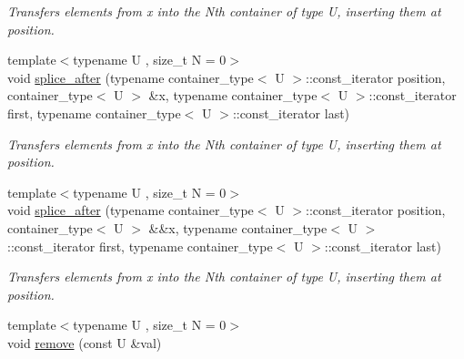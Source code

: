 \begin{DoxyCompactItemize}
\begin{DoxyCompactList}\small\item\em Transfers elements from x into the Nth container of type U, inserting them at position. \end{DoxyCompactList}\item 
\hypertarget{classheterogeneous_1_1heteroforward__list_3_01_t_00_01_types_8_8_8_4_a3d603eb927dbd44b1e90a02a49da5eea}{}{\footnotesize template$<$typename U , size\+\_\+t N = 0$>$ }\\void \hyperlink{classheterogeneous_1_1heteroforward__list_3_01_t_00_01_types_8_8_8_4_a3d603eb927dbd44b1e90a02a49da5eea}{splice\+\_\+after} (typename container\+\_\+type$<$ U $>$\+::const\+\_\+iterator position, container\+\_\+type$<$ U $>$ \&x, typename container\+\_\+type$<$ U $>$\+::const\+\_\+iterator first, typename container\+\_\+type$<$ U $>$\+::const\+\_\+iterator last)\label{classheterogeneous_1_1heteroforward__list_3_01_t_00_01_types_8_8_8_4_a3d603eb927dbd44b1e90a02a49da5eea}

\begin{DoxyCompactList}\small\item\em Transfers elements from x into the Nth container of type U, inserting them at position. \end{DoxyCompactList}\item 
\hypertarget{classheterogeneous_1_1heteroforward__list_3_01_t_00_01_types_8_8_8_4_aa551f6adbe76e12b273cfc094d20a769}{}{\footnotesize template$<$typename U , size\+\_\+t N = 0$>$ }\\void \hyperlink{classheterogeneous_1_1heteroforward__list_3_01_t_00_01_types_8_8_8_4_aa551f6adbe76e12b273cfc094d20a769}{splice\+\_\+after} (typename container\+\_\+type$<$ U $>$\+::const\+\_\+iterator position, container\+\_\+type$<$ U $>$ \&\&x, typename container\+\_\+type$<$ U $>$\+::const\+\_\+iterator first, typename container\+\_\+type$<$ U $>$\+::const\+\_\+iterator last)\label{classheterogeneous_1_1heteroforward__list_3_01_t_00_01_types_8_8_8_4_aa551f6adbe76e12b273cfc094d20a769}

\begin{DoxyCompactList}\small\item\em Transfers elements from x into the Nth container of type U, inserting them at position. \end{DoxyCompactList}\item 
\hypertarget{classheterogeneous_1_1heteroforward__list_3_01_t_00_01_types_8_8_8_4_a1e0ed92019517ef895b16231e2864d9d}{}{\footnotesize template$<$typename U , size\+\_\+t N = 0$>$ }\\void \hyperlink{classheterogeneous_1_1heteroforward__list_3_01_t_00_01_types_8_8_8_4_a1e0ed92019517ef895b16231e2864d9d}{remove} (const U \&val)\label{classheterogeneous_1_1heteroforward__list_3_01_t_00_01_types_8_8_8_4_a1e0ed92019517ef895b16231e2864d9d}


\end{DoxyCompactItemize}
